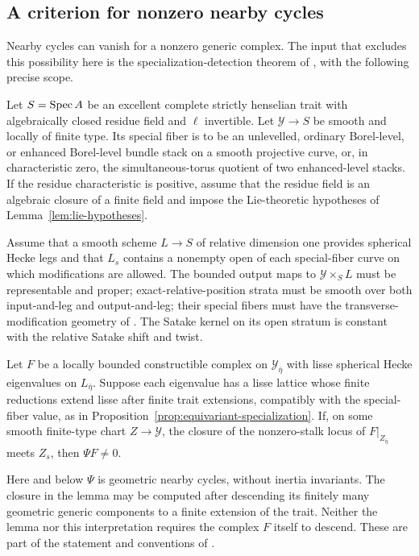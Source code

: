 \subsection{A criterion for nonzero nearby cycles}

Nearby cycles can vanish for a nonzero generic complex.  The input
that excludes this possibility here is the specialization-detection
theorem of \cite[Theorem~4.2]{CT}, with the following precise scope.

\begin{lemma}\label{lem:specialization-detection}
Let $S=\operatorname{Spec} A$ be an excellent complete strictly henselian trait
with algebraically closed residue field and $\ell$ invertible.
Let $\mathcal Y\to S$ be smooth and locally of finite type.  Its
special fiber is to be an unlevelled, ordinary Borel-level, or
enhanced Borel-level bundle stack on a smooth projective curve, or,
in characteristic zero, the simultaneous-torus quotient of two
enhanced-level stacks.  If the residue characteristic is positive,
assume that the residue field is an algebraic closure of a finite
field and impose the Lie-theoretic hypotheses of
Lemma~\ref{lem:lie-hypotheses}.

Assume that a smooth scheme $L\to S$ of relative dimension one
provides spherical Hecke legs and that $L_s$ contains a nonempty
open of each special-fiber curve on which modifications are allowed.
The bounded output maps to $\mathcal Y\times_S L$ must be
representable and proper; exact-relative-position strata must be
smooth over both input-and-leg and output-and-leg; their special
fibers must have the transverse-modification geometry of
\cite[Proposition~3.3]{CT}.  The Satake kernel on its open stratum is
constant with the relative Satake shift and twist.

Let $F$ be a locally bounded constructible complex on
$\mathcal Y_{\bar\eta}$ with lisse spherical Hecke eigenvalues on
$L_{\bar\eta}$.  Suppose each eigenvalue has a lisse lattice whose
finite reductions extend lisse after finite trait extensions,
compatibly with the special-fiber value, as in
Proposition~\ref{prop:equivariant-specialization}.
If, on some smooth finite-type chart $Z\to\mathcal Y$, the closure
of the nonzero-stalk locus of $F|_{Z_{\bar\eta}}$ meets $Z_s$, then
$\Psi F\ne0$.
\end{lemma}

Here and below $\Psi$ is geometric nearby cycles, without inertia
invariants.  The closure in the lemma may be computed after
descending its finitely many geometric generic components to a
finite extension of the trait.  Neither the lemma nor this
interpretation requires the complex $F$ itself to descend.
These are part of the statement and conventions of
\cite[Theorem~4.2]{CT}.

